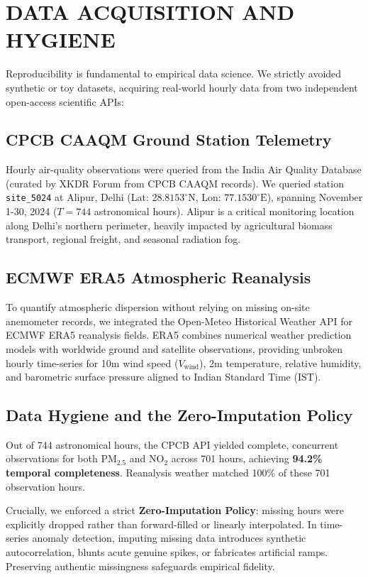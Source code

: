 \documentclass[twoside]{article}
\begin{document}
\section{DATA ACQUISITION AND HYGIENE}

Reproducibility is fundamental to empirical data science. We strictly avoided synthetic or toy datasets, acquiring real-world hourly data from two independent open-access scientific APIs:

\subsection{CPCB CAAQM Ground Station Telemetry}
Hourly air-quality observations were queried from the India Air Quality Database (curated by XKDR Forum from CPCB CAAQM records). We queried station \texttt{site\_5024} at Alipur, Delhi (Lat: $28.8153^\circ\mathrm{N}$, Lon: $77.1530^\circ\mathrm{E}$), spanning November 1-30, 2024 ($T=744$ astronomical hours). Alipur is a critical monitoring location along Delhi's northern perimeter, heavily impacted by agricultural biomass transport, regional freight, and seasonal radiation fog.

\subsection{ECMWF ERA5 Atmospheric Reanalysis}
To quantify atmospheric dispersion without relying on missing on-site anemometer records, we integrated the Open-Meteo Historical Weather API for ECMWF ERA5 reanalysis fields. ERA5 combines numerical weather prediction models with worldwide ground and satellite observations, providing unbroken hourly time-series for 10m wind speed ($V_{\mathrm{wind}}$), 2m temperature, relative humidity, and barometric surface pressure aligned to Indian Standard Time (IST).

\subsection{Data Hygiene and the Zero-Imputation Policy}
Out of 744 astronomical hours, the CPCB API yielded complete, concurrent observations for both $\mathrm{PM}_{2.5}$ and $\mathrm{NO}_2$ across 701 hours, achieving \textbf{94.2\% temporal completeness}. Reanalysis weather matched 100\% of these 701 observation hours.

Crucially, we enforced a strict \textbf{Zero-Imputation Policy}: missing hours were explicitly dropped rather than forward-filled or linearly interpolated. In time-series anomaly detection, imputing missing data introduces synthetic autocorrelation, blunts acute genuine spikes, or fabricates artificial ramps. Preserving authentic missingness safeguards empirical fidelity.
\end{document}
